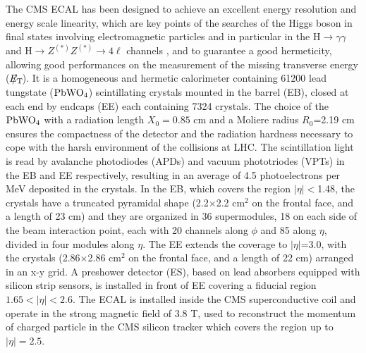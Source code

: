 \documentclass[journal]{IEEEtran}
\newcommand{\ETslash}{\ensuremath{E_{\mathrm{T}}\hspace{-1.1em}/\kern0.45em}}
\begin{document}
The CMS ECAL \cite{CMS:1997ema} has been designed to achieve an excellent energy resolution and energy scale linearity, which are key points of the searches of the Higgs boson in final states involving electromagnetic particles and in particular in the H$\to\gamma\gamma$ \cite{Khachatryan:2014ira} and H$\to Z^{(\ast)}Z^{(\ast)}\to 4\ell$ channels \cite{Chatrchyan:2013mxa}, and to guarantee a good hermeticity, allowing good performances on the measurement of the missing transverse energy ($\ETslash$).
It is a homogeneous and hermetic calorimeter containing 61200 lead tungstate ($\rm PbWO_4$) scintillating crystals mounted in the barrel (EB), closed at each end by endcaps (EE) each containing 7324 crystals. The choice of the $\rm PbWO_4$ with a radiation length $X_0=0.85$ cm and a Moliere radius $R_0$=2.19 cm ensures the compactness of the detector and the radiation hardness necessary to cope with the harsh environment of the collisions at LHC. The scintillation light is read by avalanche photodiodes (APDs) and vacuum phototriodes (VPTs) in the EB and EE
respectively, resulting in an average of 4.5 photoelectrons per MeV deposited in the crystals. In the EB, which covers the region $\vert\eta\vert<$1.48, the crystals have a truncated pyramidal shape (2.2$\times$2.2 cm$^2$ on the frontal face, and a length of 23 cm) and they are organized in 36 supermodules, 18 on each side of the beam interaction point, each with 20 channels along $\phi$ and 85 along $\eta$, divided in four modules along $\eta$. The EE extends the coverage to $\vert\eta\vert$=3.0, with the crystals (2.86$\times$2.86 cm$^2$ on the frontal face, and a length of 22 cm) arranged in an x-y grid. A preshower detector (ES), based on lead absorbers equipped with silicon strip sensors, is installed in front of EE covering a fiducial region $1.65<\vert\eta\vert<2.6$.
The ECAL is installed inside the CMS superconductive coil and operate in the strong magnetic field of 3.8 T, used to reconstruct the momentum of charged particle in the CMS silicon tracker which covers the region up to $\vert\eta\vert=2.5$.
\end{document}
